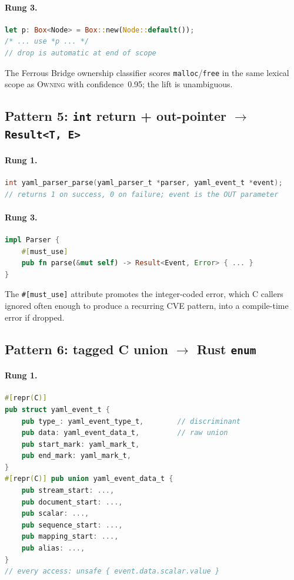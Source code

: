 \documentclass[12pt]{article}
\theoremstyle{definition}
\theoremstyle{remark}
\begin{document}
\paragraph{Rung 3.}
\begin{lstlisting}[language=Rust]
let p: Box<Node> = Box::new(Node::default());
/* ... use *p ... */
// drop is automatic at end of scope
\end{lstlisting}

The Ferrous Bridge ownership classifier scores
\texttt{malloc}/\texttt{free} in the same lexical scope as
\textsc{Owning} with confidence~0.95; the lift is unambiguous.

\subsection{Pattern 5: \texttt{int} return + out-pointer $\to$ \texttt{Result<T, E>}}

\paragraph{Rung 1.}
\begin{lstlisting}[language=C]
int yaml_parser_parse(yaml_parser_t *parser, yaml_event_t *event);
// returns 1 on success, 0 on failure; event is the OUT parameter
\end{lstlisting}
\paragraph{Rung 3.}
\begin{lstlisting}[language=Rust]
impl Parser {
    #[must_use]
    pub fn parse(&mut self) -> Result<Event, Error> { ... }
}
\end{lstlisting}

The \texttt{\#[must\_use]} attribute promotes the integer-coded error,
which C callers ignored often enough to produce a recurring CVE
pattern, into a compile-time error if dropped.

\subsection{Pattern 6: tagged C union $\to$ Rust \texttt{enum}}

\paragraph{Rung 1.}
\begin{lstlisting}[language=Rust]
#[repr(C)]
pub struct yaml_event_t {
    pub type_: yaml_event_type_t,        // discriminant
    pub data: yaml_event_data_t,         // raw union
    pub start_mark: yaml_mark_t,
    pub end_mark: yaml_mark_t,
}
#[repr(C)] pub union yaml_event_data_t {
    pub stream_start: ...,
    pub document_start: ...,
    pub scalar: ...,
    pub sequence_start: ...,
    pub mapping_start: ...,
    pub alias: ...,
}
// every access: unsafe { event.data.scalar.value }
\end{lstlisting}
\end{document}
